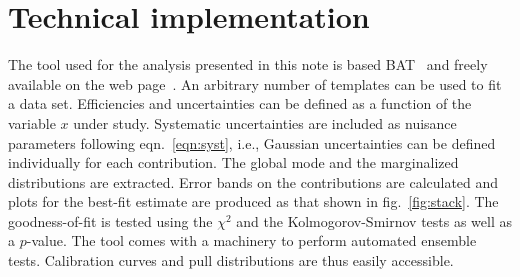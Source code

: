 \documentclass[11pt, a4paper]{article}
\begin{document}

\section{Technical implementation} 
\label{implementation}

The tool used for the analysis presented in this note is based
BAT~\cite{Caldwell:2008fw} and freely available on the web
page~\cite{BATwebpage}. An arbitrary number of templates can be used
to fit a data set. Efficiencies and uncertainties can be defined as a
function of the variable $x$ under study. Systematic uncertainties are
included as nuisance parameters following eqn.~\ref{eqn:syst}, i.e.,
Gaussian uncertainties can be defined individually for each
contribution. The global mode and the marginalized distributions are
extracted. Error bands on the contributions are calculated and plots
for the best-fit estimate are produced as that shown in
fig.~\ref{fig:stack}. The goodness-of-fit is tested using the
$\chi^{2}$ and the Kolmogorov-Smirnov tests as well as a
$p$-value. The tool comes with a machinery to perform automated
ensemble tests. Calibration curves and pull distributions are thus
easily accessible. \\
\end{document}
